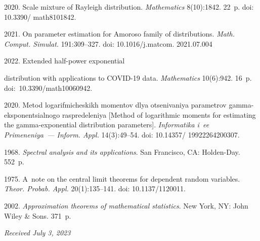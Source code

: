 \begin{multicols}{2}
{{\begin{thebibliography}{99}
 2020. Scale mixture of Rayleigh distribution. \textit{Mathematics} 8(10):1842. 22~p. doi: 10.3390/ math8101842.

 2021. On parameter estimation for Amoroso family of distributions.
\textit{Math. Comput. Simulat.} 191:309--327. doi: 10.1016/j.matcom. 2021.07.004

 2022.
Extended half-power exponential\linebreak
\vspace*{-12pt}

\pagebreak

\noindent
distribution with applications to COVID-19 data.
\textit{Mathematics} 10(6):942. 16~p. doi:~10.3390/math10060942.

 2020. Me\-tod lo\-ga\-rif\-mi\-che\-skikh mo\-men\-tov dlya otse\-ni\-va\-niya pa\-ra\-met\-rov gamma-eksponentsialnogo ras\-pre\-de\-le\-niya
[Method of logarithmic moments for estimating the gamma-exponential distribution parameters]. \textit{Informatika i~ee Primeneniya~--- Inform. Appl.} 
 14(3):49--54. doi: 10.14357/ 19922264200307.
 
 1968. \textit{Spectral analysis and its applications}. San Francisco, CA: Holden-Day. 552~p.
 
 1975. A~note on the central limit theorems for dependent random variables. 
\textit{Theor. Probab. Appl.} 20(1):135--141. doi: 10.1137/1120011.

 2002. 
\textit{Approximation theorems of mathematical statistics}.
New York, NY: John Wiley \& Sons. 371~p.
\end{thebibliography}

 }
 }

\end{multicols}

\vspace*{-6pt}

\hfill{\small\textit{Received July 3, 2023}} 

\vspace*{-12pt}



